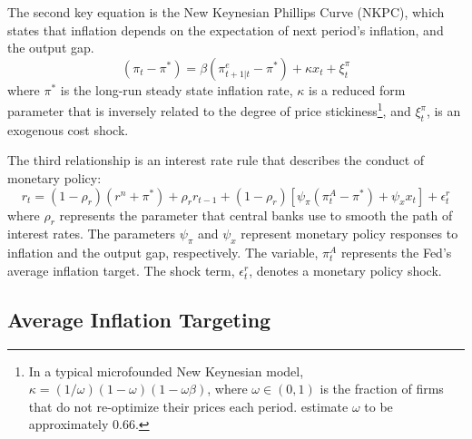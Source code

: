 \documentclass[english,authoryear,12pt]{elsarticle}
\begin{document}
The second key equation is the New Keynesian Phillips Curve (NKPC), which states that inflation depends on the expectation of next period's inflation, and the output gap.
\begin{equation}\label{eq:PhillipsCurvee}
	(\pi_t - \pi^*) = \beta (\pi_{t+1|t}^e - \pi^*) + \kappa x_t + \xi_t^{\pi}
\end{equation}
where $\pi^*$ is the long-run steady state inflation rate, $\kappa$ is a reduced form parameter that is inversely related to the degree of price stickiness\footnote{In a typical microfounded New Keynesian model, $\kappa=(1/\omega)(1-\omega)(1-\omega\beta)$, where $\omega \in (0,1)$ is the fraction of firms that do not re-optimize their prices each period. \citet{smetswouters2007} estimate $\omega$ to be approximately 0.66.}, and $\xi_t^\pi$, is an exogenous cost shock.

The third relationship is an interest rate rule that describes the conduct of monetary policy:
\begin{equation}\label{eq:TaylorRule}
	r_t = (1-\rho_r)(r^n + \pi^*) + \rho_r r_{t-1} + (1-\rho_r) \left[ \psi_\pi (\pi_t^A - \pi^*) + \psi_x x_t \right] + \epsilon_t^{r}
\end{equation}
where $\rho_r$ represents the parameter that central banks use to smooth the path of interest rates. The parameters $\psi_\pi$ and $\psi_x$ represent monetary policy responses to inflation and the output gap, respectively. The variable, $\pi_t^A$ represents the Fed's average inflation target. The shock term, $\epsilon_t^r$, denotes a monetary policy shock.

\subsection{Average Inflation Targeting}
\end{document}
